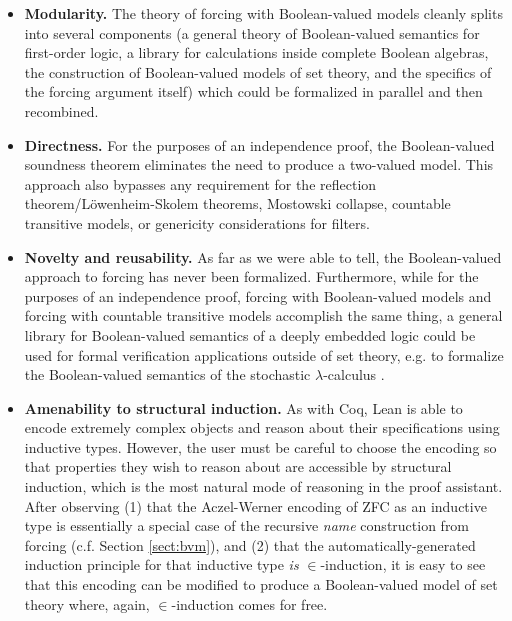 \documentclass[a4paper,USenglish,cleveref, autoref]{lipics-v2019}
\begin{document}
\begin{itemize}
\item \textbf{Modularity.} The theory of forcing with Boolean-valued models cleanly splits into several components (a general theory of Boolean-valued semantics for first-order logic, a library for calculations inside complete Boolean algebras, the construction of Boolean-valued models of set theory, and the specifics of the forcing argument itself) which could be formalized in parallel and then recombined.

\item \textbf{Directness.} For the purposes of an independence proof, the Boolean-valued soundness theorem eliminates the need to produce a two-valued model. This approach also bypasses any requirement for the reflection theorem/L\"owenheim-Skolem theorems, Mostowski collapse, countable transitive models, or genericity considerations for filters.

\item \textbf{Novelty and reusability.} As far as we were able to tell, the Boolean-valued approach to forcing has never been formalized. Furthermore, while for the purposes of an independence proof, forcing with Boolean-valued models and forcing with countable transitive models accomplish the same thing, a general library for Boolean-valued semantics of a deeply embedded logic could be used for formal verification applications outside of set theory, e.g. to formalize the Boolean-valued semantics of the stochastic $\lambda$-calculus \cite{scott2}.

  \item \textbf{Amenability to structural induction.} As with Coq, Lean is able to encode extremely complex objects and reason about their specifications using inductive types. However, the user must be careful to choose the encoding so that properties they wish to reason about are accessible by structural induction, which is the most natural mode of reasoning in the proof assistant. After observing (1) that the Aczel-Werner encoding of ZFC as an inductive type is essentially a special case of the recursive \emph{name} construction from forcing (c.f. Section \ref{sect:bvm}), and (2) that the automatically-generated induction principle for that inductive type \emph{is} $\in$-induction, it is easy to see that this encoding can be modified to produce a Boolean-valued model of set theory where, again, $\in$-induction comes for free.
\end{itemize}
\end{document}
